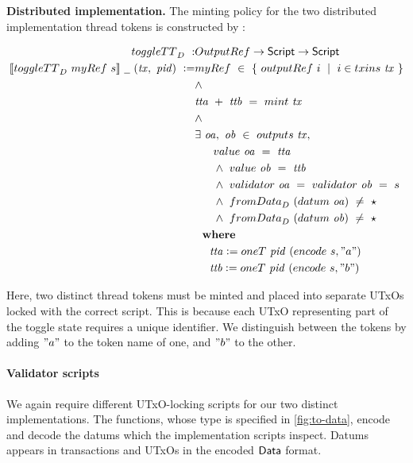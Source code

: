 \textbf{Distributed implementation. }
The minting policy for the two distributed implementation
thread tokens is constructed by :

  \begin{align*}
    \toggleTT_D~:& \OutputRef \to \Script \to \Script \\
    \applyMPScript{\toggleTT_D~\mathsf{myRef}~s}~\wcard~(\var{tx},~\var{pid})~\leteq &
    \fun{myRef}~\in~ \{ ~\outputref~i~\mid~i \in \inputs~\var{tx}~\} \\
    & \wedge \\
    & \var{tta} ~+~ \var{ttb} ~=~ \mint~\var{tx} \\
    & \wedge  \\
    &\exists~\var{oa},~\var{ob}~\in~\fun{outputs}~\var{tx}, \\
    &~~~~~\val~\var{oa}~=~\var{tta}~ \\
    &~~~~~\wedge ~\val~\var{ob}~=~\var{ttb}~\\
    & ~~~~~\wedge ~\validator~\var{oa}~=~\validator~\var{ob}~=~s \\
    & ~~~~~\wedge ~\fun{fromData}_D~(\datum~\var{oa})~\neq~\emptytype~ \\
    & ~~~~~\wedge~\fun{fromData}_D~(\datum~\var{ob})~\neq~\emptytype~~ \\
    & \where \\
    & ~~~~\var{tta} \leteq \mathsf{oneT}~\var{pid}~(\fun{encode}~s, "a") \\
    & ~~~~\var{ttb} \leteq \mathsf{oneT}~\var{pid}~(\fun{encode}~s, "b")
  \end{align*}

Here, two distinct thread tokens must be minted and placed into separate UTxOs
locked with the correct script. This is because each UTxO representing part of the
toggle state requires a unique identifier. We distinguish between the tokens
by adding $"a"$ to the token name of one, and $"b"$ to the other.

\paragraph{Validator scripts}

We again require different UTxO-locking scripts for our two distinct implementations.
The functions, whose type is specified in \ref{fig:to-data}, encode and decode the
datums which the implementation scripts inspect.
Datums appears in transactions and UTxOs in the encoded $\textsf{Data}$ format.

